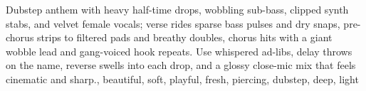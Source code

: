 
\begin{notes}
\end{notes}

\begin{style}
Dubstep anthem with heavy half-time drops, wobbling sub-bass, clipped synth stabs, and velvet female vocals; verse rides sparse bass pulses and dry snaps, pre-chorus strips to filtered pads and breathy doubles, chorus hits with a giant wobble lead and gang-voiced hook repeats. %
Use whispered ad-libs, delay throws on the name, reverse swells into each drop, and a glossy close-mic mix that feels cinematic and sharp., beautiful, soft, playful, fresh, piercing, dubstep, deep, light
\end{style}

